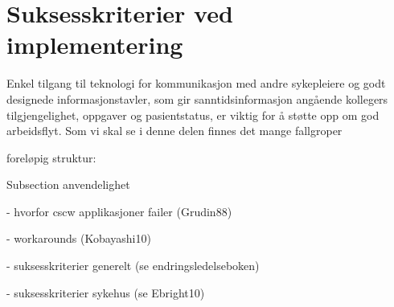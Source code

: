 \section{Suksesskriterier ved implementering}
\label{chp: suksesskriterier}


\noindent
Enkel tilgang til teknologi for kommunikasjon med andre sykepleiere og godt designede informasjonstavler, som gir sanntidsinformasjon angående kollegers tilgjengelighet, oppgaver og pasientstatus, er viktig for å støtte opp om god arbeidsflyt\cite{Ebright10}. Som vi skal se i denne delen finnes det mange fallgroper 


foreløpig struktur:

Subsection anvendelighet


- hvorfor cscw applikasjoner failer (Grudin88)

- workarounds (Kobayashi10)

- suksesskriterier generelt (se endringsledelseboken)

- suksesskriterier sykehus (se Ebright10)

\noindent



